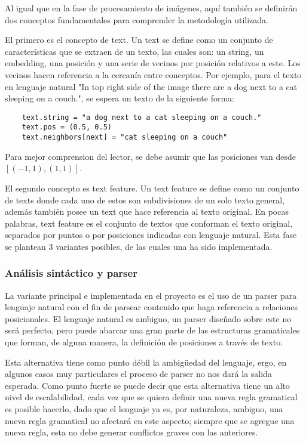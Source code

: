 Al igual que en la fase de procesamiento de imágenes, aquí también se definirán dos conceptos fundamentales para comprender la metodología utilizada.

El primero es el concepto de text. Un text se define como un conjunto de características que se extraen de un texto, las cuales son: un string, un embedding, una posición y una serie de vecinos por posición relativos a este. Los vecinos hacen referencia a la cercanía entre conceptos. Por ejemplo, para el texto en lenguaje natural "In top right side of the image there are a dog next to a cat sleeping on a couch.", se espera un texto de la siguiente forma:
\begin{lstlisting}
    text.string = "a dog next to a cat sleeping on a couch."
    text.pos = (0.5, 0.5)
    text.neighbors[next] = "cat sleeping on a couch"
\end{lstlisting}
Para mejor comprension del lector, se debe asumir que las posiciones van desde $[(-1,1), (1,1)]$.

El segundo concepto es text feature. Un text feature se define como un conjunto de texts donde cada uno de estos son subdivisiones de un solo texto general, además también posee un text que hace referencia al texto original. En pocas palabras, text feature es el conjunto de textos que conforman el texto original, separados por puntos o por posiciones indicadas con lenguaje natural.
Esta fase se plantean 3 variantes posibles, de las cuales una ha sido implementada.

\subsubsection*{Análisis sintáctico y parser}
La variante principal e implementada en el proyecto es el uso de un parser para lenguaje natural con el fin de parsear contenido que haga referencia a relaciones posicionales. El lenguaje natural es ambiguo, un parser diseñado sobre este no será perfecto, pero puede abarcar una gran parte de las estructuras gramaticales que forman, de alguna manera, la definición de posiciones a través de texto.

Esta alternativa tiene como punto débil la ambigüedad del lenguaje, ergo, en algunos casos muy particulares el proceso de parser no nos dará la salida esperada. Como punto fuerte se puede decir que esta alternativa tiene un alto nivel de escalabilidad, cada vez que se quiera definir una nueva regla gramatical es posible hacerlo, dado que el lenguaje ya es, por naturaleza, ambiguo, una nueva regla gramatical no afectará en este aspecto; siempre que se agregue una nueva regla, esta no debe generar conflictos graves con las anteriores.

